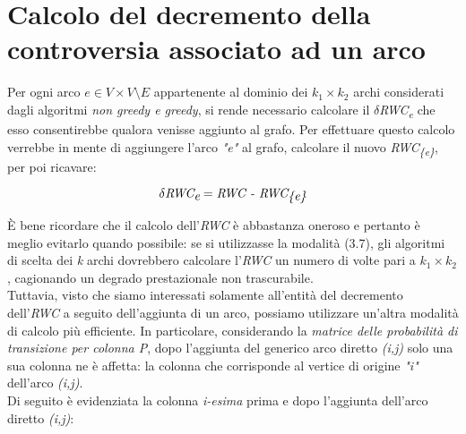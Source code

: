\section{Calcolo del decremento della controversia associato ad un arco}

Per ogni arco \textit{$e \in V \times V \setminus E$} appartenente al dominio dei \textit{$k_1 \times k_2$} archi considerati dagli algoritmi \textit{non greedy e greedy}, si rende necessario calcolare il \textit{$\delta$RWC\textsubscript{e}} che esso consentirebbe qualora venisse aggiunto al grafo. Per effettuare questo calcolo verrebbe in mente di aggiungere l'arco \textit{"e"} al grafo, calcolare il nuovo \textit{RWC\textsubscript{\{e\}}}, per poi ricavare: 

\begin{equation}
\textit{$\delta$RWC\textsubscript{e}} = \textit{RWC - RWC\textsubscript{\{e\}}}
\end{equation}

\`E bene ricordare che il calcolo dell'\textit{RWC} è abbastanza oneroso e pertanto è meglio evitarlo quando possibile: se si utilizzasse la modalità (3.7), gli algoritmi di scelta dei \textit{k} archi dovrebbero calcolare l'\textit{RWC} un numero di volte pari a \textit{$k_1 \times k_2$}, cagionando un degrado prestazionale non trascurabile.
\\Tuttavia, visto che siamo interessati solamente all'entità del decremento dell'\textit{RWC} a seguito dell'aggiunta di un arco, possiamo utilizzare un'altra modalità di calcolo più efficiente. In particolare, considerando la \textit{matrice delle probabilità di transizione per colonna P}, dopo l'aggiunta del generico arco diretto \textit{(i,j)} solo una sua colonna ne è affetta: la colonna che corrisponde al vertice di origine \textit{"i"} dell'arco \textit{(i,j)}.
\\Di seguito è evidenziata la colonna \textit{i-esima} prima e dopo l'aggiunta dell'arco diretto \textit{(i,j)}:

